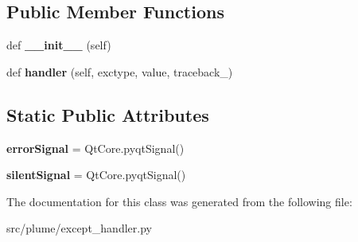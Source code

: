 \subsection*{Public Member Functions}
\begin{DoxyCompactItemize}
\item 
def {\bfseries \+\_\+\+\_\+init\+\_\+\+\_\+} (self)\hypertarget{classplume-creator_1_1src_1_1plume_1_1except__handler_1_1_exception_handler_a30e3f418fbd505780dd471c21978f48e}{}\label{classplume-creator_1_1src_1_1plume_1_1except__handler_1_1_exception_handler_a30e3f418fbd505780dd471c21978f48e}

\item 
def {\bfseries handler} (self, exctype, value, traceback\+\_\+)\hypertarget{classplume-creator_1_1src_1_1plume_1_1except__handler_1_1_exception_handler_abaa01595b5b74604a5ddbe7281bcb57c}{}\label{classplume-creator_1_1src_1_1plume_1_1except__handler_1_1_exception_handler_abaa01595b5b74604a5ddbe7281bcb57c}

\end{DoxyCompactItemize}
\subsection*{Static Public Attributes}
\begin{DoxyCompactItemize}
\item 
{\bfseries error\+Signal} = Qt\+Core.\+pyqt\+Signal()\hypertarget{classplume-creator_1_1src_1_1plume_1_1except__handler_1_1_exception_handler_a76e55dff9b45c02ace65e33cf5608b60}{}\label{classplume-creator_1_1src_1_1plume_1_1except__handler_1_1_exception_handler_a76e55dff9b45c02ace65e33cf5608b60}

\item 
{\bfseries silent\+Signal} = Qt\+Core.\+pyqt\+Signal()\hypertarget{classplume-creator_1_1src_1_1plume_1_1except__handler_1_1_exception_handler_ad541057c0c71c56cd492545c033864f7}{}\label{classplume-creator_1_1src_1_1plume_1_1except__handler_1_1_exception_handler_ad541057c0c71c56cd492545c033864f7}

\end{DoxyCompactItemize}


The documentation for this class was generated from the following file\+:\begin{DoxyCompactItemize}
\item 
src/plume/except\+\_\+handler.\+py\end{DoxyCompactItemize}
